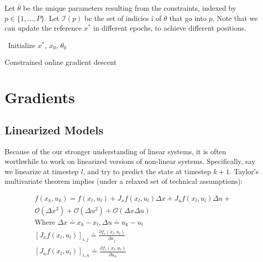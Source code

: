\documentclass{article}
\begin{document}
Let $\bar{\theta}$ be the unique parameters resulting from the constraints, indexed by $p \in \{1, ..., P \}$. Let $\mathcal{I}(p)$ be the set of indicies i of $\theta$ that go into $p$. Note that we can update the reference $x^*$ in different epochs, to achieve different positions.

\begin{algorithm}[H]

    \SetAlgoLined
    \init\ Initialize $x^*$, $x_0$, $\theta_0$ \\
    \caption{Constrained online gradient descent}
    \label{algo:tiny_OGD}
\end{algorithm}


\section{Gradients}
\subsection{Linearized Models}

Because of the our stronger understanding of linear systems, it is often worthwhile to work on linearized versions of non-linear systems. Specifically, say we linearize at timestep $l$, and try to predict the state at timestep $k+1$. Taylor's multivariate theorem implies (under a relaxed set of technical assumptions):

\begin{gather}
    f(x_k, u_k) = f(x_l, u_l) + J_x f(x_l, u_l)\Delta x + J_u f(x_l, u_l)\Delta u + \label{eqn:jaclin}\\
    \mathcal{O}(\Delta x ^ 2) + \mathcal{O}(\Delta u ^ 2) + \mathcal{O}(\Delta x \Delta u) \label{eqn:error_terms} \\
    \mbox{Where } \Delta x \doteq x_k - x_l, \Delta u \doteq u_k - u_l \\
    [J_x f(x_l, u_l)]_{i,j} \doteq \frac{\partial f_i(x_l, u_l)}{\partial x_j} \\
    [J_u f(x_l, u_l)]_{i,n} \doteq \frac{\partial f_i(x_l, u_l)}{\partial u_n} \\
\end{gather}
\end{document}
